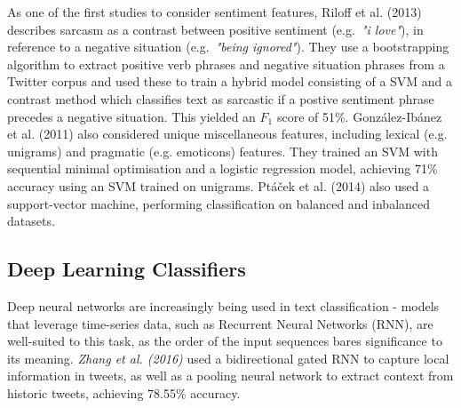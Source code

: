 \documentclass[12pt,a4paper]{article}
\begin{document}

As one of the first studies to consider sentiment features, Riloff et al. (2013) \cite{riloff2013sarcasm} describes sarcasm as a contrast between positive sentiment (e.g.\ \textit{"i love"}), in reference to a negative situation (e.g.\ \textit{"being ignored"}). They use a bootstrapping algorithm to extract positive verb phrases and negative situation phrases from a Twitter corpus and used these to train a hybrid model consisting of a SVM and a contrast method which classifies text as sarcastic if a postive sentiment phrase precedes a negative situation. This yielded an $F_1$ score of 51\%. Gonz{\'a}lez-Ib{\'a}nez et al. (2011) \cite{gonzalez2011identifying} also considered unique miscellaneous features, including lexical (e.g. unigrams) and pragmatic (e.g. emoticons) features. They trained an SVM with sequential minimal optimisation and a logistic regression model, achieving 71\% accuracy using an SVM trained on unigrams. Pt{\'a}{\v{c}ek et al. (2014)} \cite{ptavcek2014sarcasm} also used a support-vector machine, performing classification on balanced and inbalanced datasets.


\subsection{Deep Learning Classifiers}\vspace{-10pt}
\noindent Deep neural networks are increasingly being used in text classification - models that leverage time-series data, such as Recurrent Neural Networks (RNN), are well-suited to this task, as the order of the input sequences bares significance to its meaning. \textit{Zhang et al. (2016)} \cite{zhang2016tweet} used a bidirectional gated RNN to capture local information in tweets, as well as a pooling neural network to extract context from historic tweets, achieving 78.55\% accuracy. 
\end{document}
